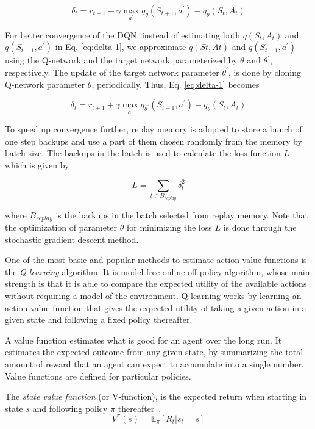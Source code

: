 \begin{equation} \label{eq:delta-1}
\delta_t = r_{t+1} + \gamma \max_{a^ \prime} q_\theta(S_{t+1},a^ \prime) - q_\theta(S_t,A_t)
\end{equation}

For better convergence of the DQN, instead of estimating both $q(S_t,A_t)$ and $q(S_{t+1},a^ \prime)$ in  Eq. \ref{eq:delta-1}, we approximate $q(St,At)$ and $q(S_{t+1},a^ \prime)$ using the Q-network and the target network parameterized by $\theta$ and $\theta^{\prime}$, respectively. The update of the target network parameter $\theta^{\prime}$, is done by cloning Q-network parameter $\theta$, periodically. Thus, Eq. \ref{eq:delta-1} becomes

\begin{equation}
\delta_t = r_{t+1} + \gamma \max_{a^ \prime} q_{\theta^{\prime}}(S_{t+1},a^ \prime) - q_\theta(S_t,A_t)
\end{equation}

To speed up convergence further, replay memory is adopted to store a bunch of one step backups and use a part of them chosen randomly from the memory by batch size. The backups in the batch is used to calculate the loss function $L$ which is given by

\begin{equation}
L = \sum_{t\in B_{replay}}\delta_t^2
\end{equation}

where $B_{replay}$ is the backups in the batch selected from replay memory. Note that the optimization of parameter $\theta$ for minimizing the loss $L$ is done through the stochastic gradient descent method.

One of the most basic and popular methods to estimate action-value functions is the \emph{Q-learning} algorithm. It is model-free online off-policy algorithm, whose main strength is that it is able to compare the expected utility of the available actions without requiring a model of the environment. Q-learning works by learning an action-value function that gives the expected utility of taking a given action in a given state and following a fixed policy thereafter.

A value function estimates what is good for an agent over the long run. It estimates the expected outcome from any given state, by summarizing the total amount of reward that an agent can expect to accumulate into a single number. Value functions are defined for particular policies.

The \emph{state value function} (or V-function), is the expected return when starting in state $s$ and following policy $\pi$ thereafter~\citep{Sutton1998RL},
%
\begin{equation}
V^\pi(s) = \mathbb{E}_\pi \left[R_t | s_t = s \right]
\end{equation}

